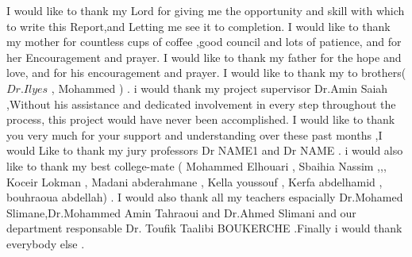 
I would like to thank my Lord for giving me the opportunity and skill with which to write this Report,and Letting me see it to completion. I would like to thank my mother for countless cups of coffee ,good council and lots of patience, and for her Encouragement and prayer. I would like to thank my father for the hope and love, and for his encouragement and prayer. I would like to thank my to brothers( $Dr.Ilyes$ , Mohammed ) . i would thank my project supervisor Dr.Amin Saiah ,Without his assistance and dedicated involvement in every step throughout the process, this project would have never been accomplished. I would like to thank you very much for your support and understanding over these past months ,I would Like to thank my jury professors Dr NAME1  and Dr NAME . i would also like to thank my best college-mate ( Mohammed Elhouari , Sbaihia Nassim ,,, Koceir Lokman , Madani abderahmane , Kella youssouf , Kerfa abdelhamid , bouhraoua abdellah) . I would also thank all my teachers espacially Dr.Mohamed Slimane,Dr.Mohammed Amin Tahraoui and Dr.Ahmed Slimani  and our department responsable Dr. Toufik Taalibi BOUKERCHE .Finally i would thank everybody else .
